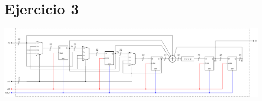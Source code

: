 \section{Ejercicio 3}
\begin{center}
    \includegraphics[angle=90, scale=.65]{../test_module/architecture.pdf}
\end{center}

